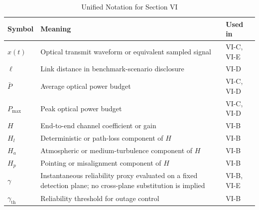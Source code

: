 \documentclass[letterpaper,journal]{IEEEtran}
\begin{document}
\begin{table}[!t]
    \caption{Unified Notation for Section VI}
    \label{tab:section6_notation}
    \centering
    \footnotesize
    \begin{tabularx}{\columnwidth}{@{}>{\raggedright\arraybackslash}p{1.85cm}>{\raggedright\arraybackslash}X>{\raggedright\arraybackslash}p{1.55cm}@{}}
        \toprule
        \textbf{Symbol}      & \textbf{Meaning}                                                                                             & \textbf{Used in}       \\
        \midrule
        $x(t)$               & Optical transmit waveform or equivalent sampled signal                                                       & VI-C, VI-E             \\
        $\ell$               & Link distance in benchmark-scenario disclosure                                                               & VI-D                   \\
        $\bar P$             & Average optical power budget                                                                                 & VI-C, VI-D             \\
        $P_{\max}$           & Peak optical power budget                                                                                    & VI-C, VI-D             \\
        $H$                  & End-to-end channel coefficient or gain                                                                       & VI-B                   \\
        $H_l$                & Deterministic or path-loss component of $H$                                                                  & VI-B                   \\
        $H_a$                & Atmospheric or medium-turbulence component of $H$                                                            & VI-B                   \\
        $H_p$                & Pointing or misalignment component of $H$                                                                    & VI-B                   \\
        $\gamma$             & Instantaneous reliability proxy evaluated on a fixed detection plane; no cross-plane substitution is implied & VI-B, VI-E             \\
        $\gamma_{\text{th}}$ & Reliability threshold for outage control                                                                     & VI-B                   \\

\end{tabularx}
\end{table}
\end{document}
